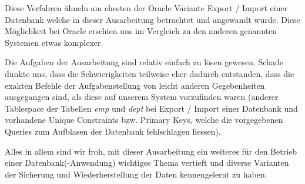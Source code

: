 \documentclass[11pt,a4paper,parskip=half]{scrartcl}
\begin{document}
Diese Verfahren ähneln am ehesten der Oracle Variante \glqq{}Export / Import einer Datenbank\grqq{} welche in dieser Ausarbeitung betrachtet und angewandt wurde. Diese Möglichkeit bei Oracle erschien uns im Vergleich zu den anderen genannten Systemen etwas komplexer.

Die Aufgaben der Ausarbeitung sind relativ einfach zu lösen gewesen. Schade dünkte uns, dass die Schwierigkeiten teilweise eher dadurch entstanden, dass die exakten Befehle der Aufgabenstellung von leicht anderen Gegebenheiten ausgegangen sind, als diese auf unserem System vorzufinden waren (anderer Tablespace der Tabellen \emph{emp} und \emph{dept} bei \glqq{}Export / Import einer Datenbank\grqq{} und vorhandene Unique Constraints bzw. Primary Keys, welche die vorgegebenen Queries zum \glqq{}Aufblasen\grqq{} der Datenbank fehlschlagen liessen).

Alles in allem sind wir froh, mit dieser Ausarbeitung ein weiteres für den Betrieb einer Datenbank(-Anwendung) wichtiges Thema vertieft und diverse Varianten der Sicherung und Wiederherstellung der Daten kennengelernt zu haben.
\end{document}
